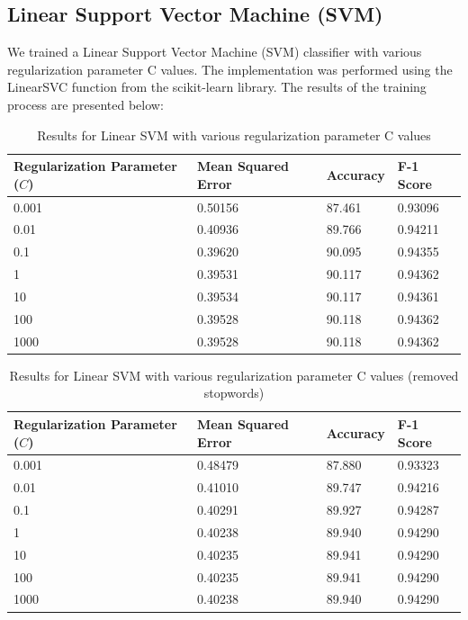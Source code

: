 \documentclass{article}
\begin{document}
\subsection{Linear Support Vector Machine (SVM)}

We trained a Linear Support Vector Machine (SVM) classifier with various regularization parameter C values. The implementation was performed using the LinearSVC function from the scikit-learn library. The results of the training process are presented below:

\begin{table}[h]
\centering
\begin{tabular}{llll}
\toprule
\textbf{Regularization Parameter ($C$)} & \textbf{Mean Squared Error} & \textbf{Accuracy} & \textbf{F-1 Score} \\
\midrule
0.001 & 0.50156 & 87.461 & 0.93096 \\
0.01 & 0.40936 & 89.766 & 0.94211 \\
0.1 & 0.39620 & 90.095 & 0.94355 \\
1 & 0.39531 & 90.117 & 0.94362 \\
10 & 0.39534 & 90.117 & 0.94361 \\
100 & 0.39528 & 90.118 & 0.94362 \\
1000 & 0.39528 & 90.118 & 0.94362 \\
\bottomrule
\end{tabular}
\caption{Results for Linear SVM with various regularization parameter C values}
\label{table:svm_results}
\end{table}

\pagebreak

\begin{table}[h]
\centering
\begin{tabular}{llll}
\toprule
\textbf{Regularization Parameter ($C$)} & \textbf{Mean Squared Error} & \textbf{Accuracy} & \textbf{F-1 Score} \\
\midrule
0.001 & 0.48479 & 87.880 & 0.93323 \\
0.01 & 0.41010 & 89.747 & 0.94216 \\
0.1 & 0.40291 & 89.927 & 0.94287 \\
1 & 0.40238 & 89.940 & 0.94290 \\
10 & 0.40235 & 89.941 & 0.94290 \\
100 & 0.40235 & 89.941 & 0.94290 \\
1000 & 0.40238 & 89.940 & 0.94290 \\
\bottomrule
\end{tabular}
\caption{Results for Linear SVM with various regularization parameter C values (removed stopwords)}
\label{table:svm_results_removed_stopwords}
\end{table}
\end{document}
